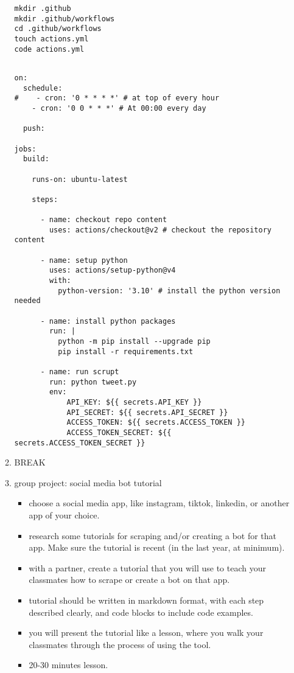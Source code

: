\documentclass[11pt]{article}
\begin{document}
\begin{enumerate}
\begin{enumerate}
\begin{verbatim}
mkdir .github
mkdir .github/workflows
cd .github/workflows
touch actions.yml
code actions.yml
\end{verbatim}

\begin{verbatim}

on:
  schedule:
#    - cron: '0 * * * *' # at top of every hour
    - cron: '0 0 * * *' # At 00:00 every day

  push: 

jobs:
  build:

    runs-on: ubuntu-latest

    steps:

      - name: checkout repo content
        uses: actions/checkout@v2 # checkout the repository content

      - name: setup python
        uses: actions/setup-python@v4
        with:
          python-version: '3.10' # install the python version needed

      - name: install python packages
        run: |
          python -m pip install --upgrade pip
          pip install -r requirements.txt

      - name: run scrupt 
        run: python tweet.py
        env: 
            API_KEY: ${{ secrets.API_KEY }}
            API_SECRET: ${{ secrets.API_SECRET }}
            ACCESS_TOKEN: ${{ secrets.ACCESS_TOKEN }}
            ACCESS_TOKEN_SECRET: ${{ secrets.ACCESS_TOKEN_SECRET }}

\end{verbatim}

\item BREAK
\label{sec:orgef89494}
\item group project: social media bot tutorial
\label{sec:org63f7c89}
\begin{itemize}
\item choose a social media app, like instagram, tiktok, linkedin, or
another app of your choice.
\item research some tutorials for scraping and/or creating a bot for that
app. Make sure the tutorial is recent (in the last year, at
minimum).
\item with a partner, create a tutorial that you will use to teach your
classmates how to scrape or create a bot on that app.
\item tutorial should be written in markdown format, with each step
described clearly, and code blocks to include code examples.
\item you will present the tutorial like a lesson, where you walk your
classmates through the process of using the tool.
\item 20-30 minutes lesson.
\end{itemize}


\end{enumerate}
\end{enumerate}
\end{document}
